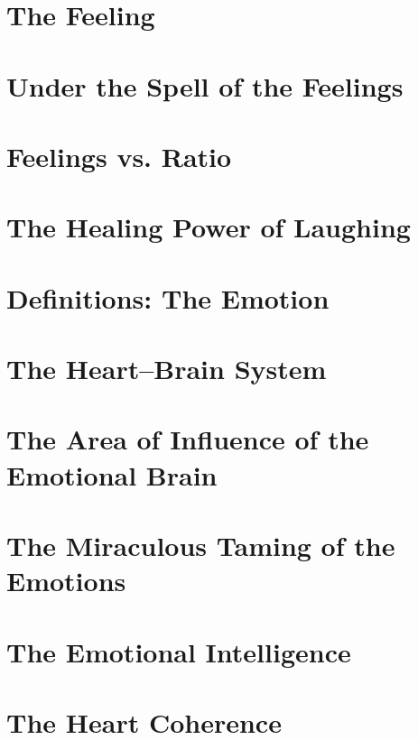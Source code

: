 \documentclass[../main.tex]{subfiles}
\begin{document}
\chapter{The Feeling}


\chapter{Under the Spell of the Feelings}


\chapter{Feelings vs.  Ratio}


\chapter{The Healing Power of Laughing}


\chapter{Definitions: The Emotion}


\chapter{The Heart--Brain System}


\chapter[Influence of the Emotional Brain]{The Area of Influence of the Emotional Brain}


\chapter{The Miraculous Taming of the Emotions}


\chapter{The Emotional Intelligence}


\chapter{The Heart Coherence}

\end{document}

